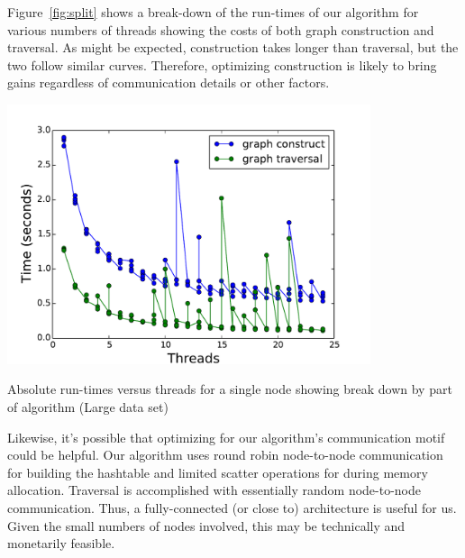 \documentclass{article}
\begin{document}
Figure~\ref{fig:split} shows a break-down of the run-times of our algorithm for various numbers of threads showing the costs of both graph construction and traversal. As might be expected, construction takes longer than traversal, but the two follow similar curves. Therefore, optimizing construction is likely to bring gains regardless of communication details or other factors. 

\begin{minipage}{\linewidth}
  \captionsetup{type=figure}
  \begin{center}
  \includegraphics[width=0.8\textwidth]{single_split_time.pdf}
  \end{center}
  \caption{Absolute run-times versus threads for a single node showing break down by part of algorithm (Large data set)} \label{fig:split}
\end{minipage}

Likewise, it's possible that optimizing for our algorithm's communication motif could be helpful. Our algorithm uses round robin node-to-node communication for building the hashtable and limited scatter operations for during memory allocation. Traversal is accomplished with essentially random node-to-node communication. Thus, a fully-connected (or close to) architecture is useful for us. Given the small numbers of nodes involved, this may be technically and monetarily feasible.
\end{document}
